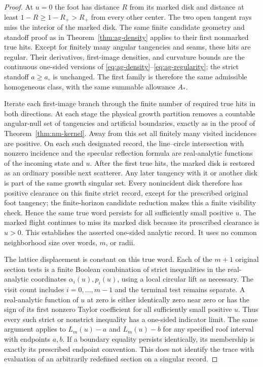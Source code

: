 \begin{proof}
At $u=0$ the foot has distance $R$ from its marked disk and
distance at least $1-R\ge1-R_+>R_+$ from every other center.
The two open tangent rays miss the interior of the marked disk.
The same finite candidate geometry and standoff proof as in
Theorem~\ref{thm:ag-density} applies to their first nonmarked
true hits.  Except for finitely many angular tangencies and seams,
these hits are regular.  Their derivatives, first-image densities,
and curvature bounds are the continuous one-sided versions of
\eqref{eq:ag-density}--\eqref{eq:ag-regularity}; the strict
standoff $a\ge a_\circ$ is unchanged.  The first family is
therefore the same admissible homogeneous class, with the same
summable allowance $A_*$.

Iterate each first-image branch through the finite number of
required true hits in both directions.  At each stage the physical
growth partition removes a countable angular-null set of tangencies
and artificial boundaries, exactly as in the proof of
Theorem~\ref{thm:nm-kernel}.  Away from this set all finitely many
visited incidences are positive.  On each such designated record,
the line--circle intersection with nonzero incidence and the
specular reflection formula are real-analytic functions of the
incoming state and $u$.  After the first true hits, the marked disk is restored as an ordinary
possible next scatterer.  Any later tangency with it or another disk
is part of the same growth singular set.  Every nonincident disk
therefore has positive clearance on this finite strict record, except
for the prescribed original foot tangency;
the finite-horizon candidate reduction makes this a finite
visibility check.  Hence the same true word persists for all
sufficiently small positive $u$.  The marked flight continues to
miss its marked disk because its prescribed clearance is $u>0$.
This establishes the asserted one-sided analytic record.  It uses
no common neighborhood size over words, $m$, or radii.

The lattice displacement is constant on this true word.  Each of
the $m+1$ original section tests is a finite Boolean combination
of strict inequalities in the real-analytic coordinates
$\alpha_i(u),p_i(u)$, using a local circular lift as necessary.
The visit count includes $i=0,\ldots,m-1$ and the terminal test
remains separate.  A real-analytic function of $u$ at zero is
either identically zero near zero or has the sign of its first
nonzero Taylor coefficient for all sufficiently small positive
$u$.  Thus every such strict or nonstrict inequality has a
one-sided indicator limit.  The same argument applies to
$L_m(u)-a$ and $L_m(u)-b$ for any specified roof interval with
endpoints $a,b$.  If a boundary equality persists identically, its
membership is exactly its prescribed endpoint convention.  This
does not identify the trace with evaluation of an arbitrarily
redefined section on a singular record.


\end{proof}
